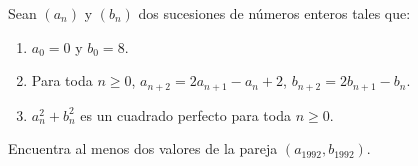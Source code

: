 Sean $(a_n)$ y $(b_n)$ dos sucesiones de números enteros tales que:
 \begin{enumerate} 
 \item $a_0=0$ y $b_0=8$. 
 \item Para toda $n \geq 0$, $a_{n+2}=2a_{n+1}-a_{n}+2$, $b_{n+2}=2b_{n+1}-b_{n}$.
 \item $a_{n}^{2}+b_{n}^{2}$ es un cuadrado perfecto para toda $n\ge 0$.
 \end{enumerate} 
Encuentra al menos dos valores de la pareja $(a_{1992},b_{1992})$.